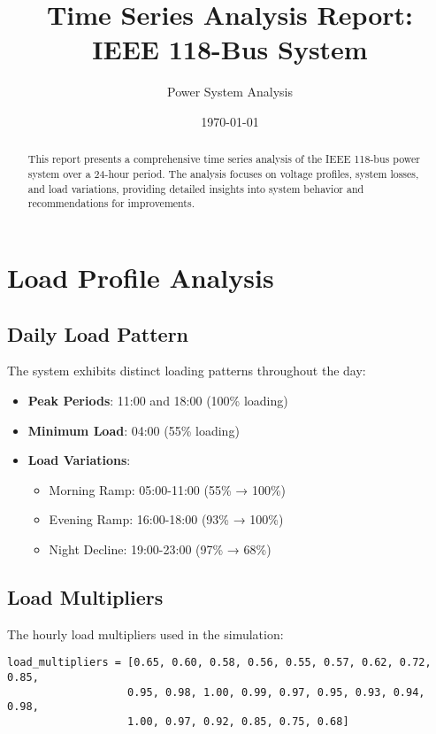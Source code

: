 \documentclass[11pt]{article}
\title{Time Series Analysis Report:\\IEEE 118-Bus System}
\author{Power System Analysis}
\date{\today}
\begin{document}
\maketitle

\begin{abstract}
This report presents a comprehensive time series analysis of the IEEE 118-bus power system over a 24-hour period. The analysis focuses on voltage profiles, system losses, and load variations, providing detailed insights into system behavior and recommendations for improvements.
\end{abstract}

\tableofcontents

\section{Load Profile Analysis}

\subsection{Daily Load Pattern}
The system exhibits distinct loading patterns throughout the day:
\begin{itemize}
    \item \textbf{Peak Periods}: 11:00 and 18:00 (100\% loading)
    \item \textbf{Minimum Load}: 04:00 (55\% loading)
    \item \textbf{Load Variations}:
    \begin{itemize}
        \item Morning Ramp: 05:00-11:00 (55\% → 100\%)
        \item Evening Ramp: 16:00-18:00 (93\% → 100\%)
        \item Night Decline: 19:00-23:00 (97\% → 68\%)
    \end{itemize}
\end{itemize}

\subsection{Load Multipliers}
The hourly load multipliers used in the simulation:
\begin{lstlisting}
load_multipliers = [0.65, 0.60, 0.58, 0.56, 0.55, 0.57, 0.62, 0.72, 0.85, 
                   0.95, 0.98, 1.00, 0.99, 0.97, 0.95, 0.93, 0.94, 0.98, 
                   1.00, 0.97, 0.92, 0.85, 0.75, 0.68]
\end{lstlisting}
\end{document}
